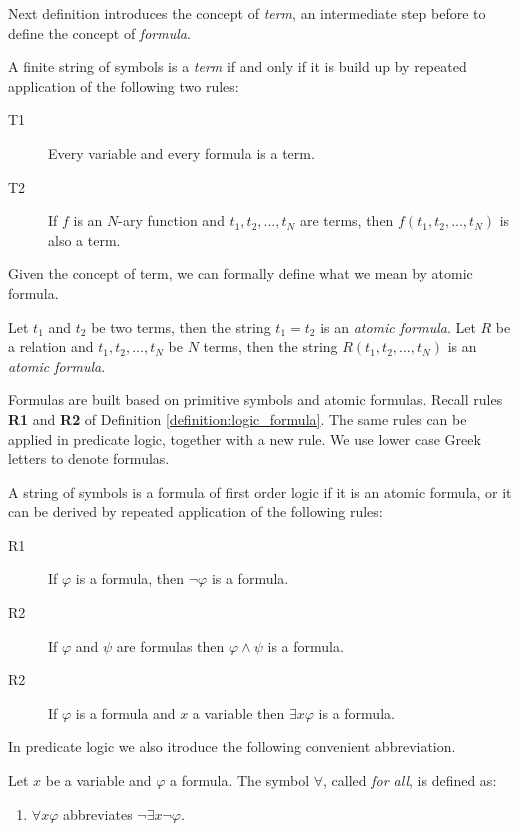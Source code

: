 Next definition introduces the concept of \emph{term}, an intermediate step before to define the concept of \emph{formula}.

\begin{definition}
A finite string of symbols is a \emph{term} if and only if it is build up by repeated application of the following two rules:
\begin{description}
\item[T1] Every variable and every formula is a term.
\item[T2] If $f$ is an $N$-ary function and $t_1, t_2, \ldots, t_N$ are terms, then $f(t_1, t_2, \ldots, t_N)$ is also a term.
\end{description}
\end{definition}

Given the concept of term, we can formally define what we mean by atomic formula.

\begin{definition}
Let $t_1$ and $t_2$ be two terms, then the string $t_1 = t_2$ is an \emph{atomic formula}.
Let $R$ be a relation and $t_1, t_2, \ldots, t_N$ be $N$ terms, then the string $R(t_1, t_2, \ldots, t_N)$ is an \emph{atomic formula}.
\end{definition}

Formulas are built based on primitive symbols and atomic formulas. Recall rules \textbf{R1} and \textbf{R2} of Definition \ref{definition:logic_formula}. The same rules can be applied in predicate logic, together with a new rule. We use lower case Greek letters to denote formulas.

\begin{definition}
A string of symbols is a formula of first order logic if it is an atomic formula, or it can be derived by repeated application of the following rules:
\begin{description}
\item[R1] If $\varphi$ is a formula, then $\lnot \varphi$ is a formula.
\item[R2] If $\varphi$ and $\psi$ are formulas then $\varphi \land \psi$ is a formula.
\item[R2] If $\varphi$ is a formula and $x$ a variable then $\exists x \varphi$ is a formula.
\end{description}
\end{definition}

In predicate logic we also itroduce the following convenient abbreviation.

\begin{definition}
Let $x$ be a variable and $\varphi$ a formula. The symbol $\forall$, called \emph{for all}, is defined as:
\begin{enumerate}
\item $\forall x \varphi$ abbreviates $\lnot \exists x \lnot \varphi$.
\end{enumerate}
\end{definition}


